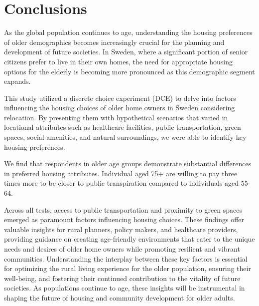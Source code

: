 \documentclass[3p,11pt ]{elsarticle}
\begin{document}
\section{Conclusions}

As the global population continues to age, understanding the housing preferences of older demographics becomes increasingly crucial for the planning and development of future societies. In Sweden, where a significant portion of senior citizens prefer to live in their own homes, the need for appropriate housing options for the elderly is becoming more pronounced as this demographic segment expands. 

This study utilized a discrete choice experiment (DCE) to delve into factors influencing the housing choices of older home owners in Sweden considering relocation.
By presenting them with hypothetical scenarios that varied in locational attributes such as healthcare facilities, public transportation, green spaces, social amenities, and natural surroundings, we were able to identify key housing preferences.


We find that respondents in older age groups demonstrate substantial differences in preferred housing attributes.
Individual aged 75+ are willing to pay three times more to be closer to public transpiration compared to individuals aged 55-64.


Across all tests, access to public transportation and proximity to green spaces emerged as paramount factors influencing housing choices. These findings offer valuable insights for rural planners, policy makers, and healthcare providers, providing guidance on creating age-friendly environments that cater to the unique needs and desires of older home owners while promoting resilient and vibrant communities. Understanding the interplay between these key factors is essential for optimizing the rural living experience for the older population, ensuring their well-being, and fostering their continued contribution to the vitality of future societies. As populations continue to age, these insights will be instrumental in shaping the future of housing and community development for older adults.

\newpage


\pagebreak




\end{document}
